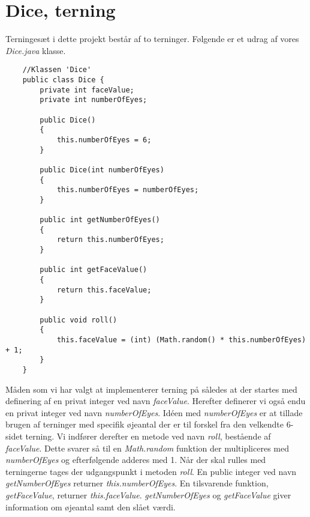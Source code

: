 \section{Dice, terning}
\noindent Terningesæt i dette projekt består af to terninger. 
Følgende er et udrag af vores \textit{Dice.java} klasse.\\
\begin{lstlisting}
    //Klassen 'Dice'    
    public class Dice {
        private int faceValue;
        private int numberOfEyes;
    
        public Dice()
        {
            this.numberOfEyes = 6;
        }
    
        public Dice(int numberOfEyes)
        {
            this.numberOfEyes = numberOfEyes;
        }
    
        public int getNumberOfEyes()
        {
            return this.numberOfEyes;
        }
    
        public int getFaceValue()
        {
            return this.faceValue;
        }
    
        public void roll()
        {
            this.faceValue = (int) (Math.random() * this.numberOfEyes) + 1;
        }
    }
\end{lstlisting}
\vspace{2ex}

\noindent Måden som vi har valgt at implementerer terning på således at der startes med definering af en privat integer ved navn \textit{faceValue}.
Herefter definerer vi også endu en privat integer ved navn \textit{numberOfEyes}.
Idéen med \textit{numberOfEyes} er at tillade brugen af terninger med specifik øjeantal der er til forskel fra den velkendte 6-sidet terning.
Vi indfører derefter en metode ved navn \textit{roll}, bestående af \textit{faceValue}.
Dette svarer så til en \textit{Math.random} funktion der multipliceres med \textit{numberOfEyes} og efterfølgende adderes med 1.
Når der skal rulles med terningerne tages der udgangspunkt i metoden \textit{roll}.
En public integer ved navn \textit{getNumberOfEyes} returner \textit{this.numberOfEyes}.
En tilsvarende funktion, \textit{getFaceValue}, returner \textit{this.faceValue}.
\textit{getNumberOfEyes} og \textit{getFaceValue} giver information om øjeantal samt den slået værdi.\\

